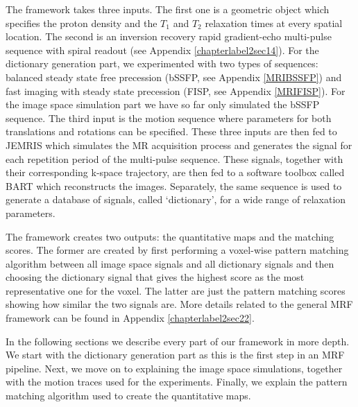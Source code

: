 The framework takes three inputs.
The first one is a geometric object which specifies the proton density and the $T_1$ and $T_2$ relaxation times at every spatial location.
The second is an inversion recovery rapid gradient-echo multi-pulse sequence with spiral readout (see Appendix \ref{chapterlabel2sec14}). 
For the dictionary generation part, we experimented with two types of sequences: balanced steady state free precession (bSSFP, see Appendix \ref{MRIBSSFP}) and fast imaging with steady state precession (FISP, see Appendix \ref{MRIFISP}).
For the image space simulation part we have so far only simulated the bSSFP sequence.
The third input is the motion sequence where parameters for both translations and rotations can be specified.
These three inputs are then fed to JEMRIS which simulates the MR acquisition process and generates the signal for each repetition period of the multi-pulse sequence.
These signals, together with their corresponding k-space trajectory, are then fed to a software toolbox called BART \cite{Lustig2016} which reconstructs the images.
Separately, the same sequence is used to generate a database of signals, called `dictionary', for a wide range of relaxation parameters.

\hfill

The framework creates two outputs: the quantitative maps and the matching scores.
The former are created by first performing a voxel-wise pattern matching algorithm between all image space signals and all dictionary signals and then choosing the dictionary signal that gives the highest score as the most representative one for the voxel.
The latter are just the pattern matching scores showing how similar the two signals are.
More details related to the general MRF framework can be found in Appendix \ref{chapterlabel2sec22}.

\hfill

In the following sections we describe every part of our framework in more depth.
We start with the dictionary generation part as this is the first step in an MRF pipeline.
Next, we move on to explaining the image space simulations, together with the motion traces used for the experiments.
Finally, we explain the pattern matching algorithm used to create the quantitative maps.

\hfill

